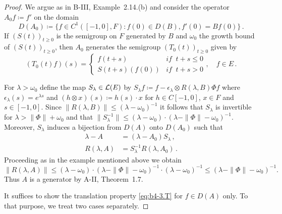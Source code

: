 \begin{proof} We argue as in B-III, Example~2.14.(b) and consider the operator $A_{0}f  \coloneq  f'$ on the domain 
\[
D(A_{0})  \coloneq  \{f \in C^1([-1,0],F) \colon f(0) \in D(B), f'(0) = Bf(0)\}\,.
\]
If $(S(t))_{t\geq 0}$ is the semigroup on $F$ generated by $B$ and $\omega_0$ the growth bound of $(S(t))_{t\geq 0}$, then $A_{0}$ generates the semigroup $(T_{0}(t))_{t\geq 0}$ given by
\[
(T_{0}(t)f)(s) = \begin{cases}
	f(t+s) & \textit{if } \ t+s \leq 0 \\
	S(t+s)(f(0)) & \textit{if } \ t+s  >  0
\end{cases}, \quad f \in E\,.
\]

For $\lambda  >  \omega_0$ define the map $S_{\lambda} \in \mathcal{L}(E)$ by $S_{\lambda}f  \coloneq  f - \epsilon_{\lambda}\otimes R(\lambda,B)\Phi f$ where $\epsilon_{\lambda}(s) = e^{\lambda s}$ and $(h\otimes x)(s)  \coloneq  h(s)\cdot x$ for $h \in C[-1,0]$, $x \in F$ and $s \in [-1,0]$.
Since $\|R(\lambda,B)\| \leq (\lambda-\omega_0)^{-1}$ it follows that $S_{\lambda}$ is invertible for $\lambda  >  \|\Phi\| + \omega_0$ and that $\|S_{\lambda}^{-1}\| \leq (\lambda-\omega_0)\cdot(\lambda-\|\Phi\|-\omega_0)^{-1}$.
Moreover, $S_{\lambda}$ induces a bijection from $D(A)$ onto $D(A_{0})$ such that
\begin{equation}\label{eq:b4-3.2}
	\begin{aligned}
		\lambda - A &= (\lambda - A_{0})S_{\lambda}\,, \\
		R(\lambda,A) &= S_{\lambda}^{-1}R(\lambda,A_{0})\,.
	\end{aligned}
\end{equation}
Proceeding as in the example mentioned above we obtain
\[\|R(\lambda,A)\| \leq (\lambda - \omega_0)\cdot(\lambda - \|\Phi\| - \omega_0)^{-1}\cdot(\lambda - \omega_0)^{-1} \leq (\lambda - \|\Phi\| - \omega_0)^{-1}.\]
Thus $A$ is a generator by A-II, Theorem~1.7.

It suffices to show the translation property \eqref{eq:b4-3.T} for $f \in D(A)$ only.
To that purpose, we treat two cases separately.


\end{proof}
